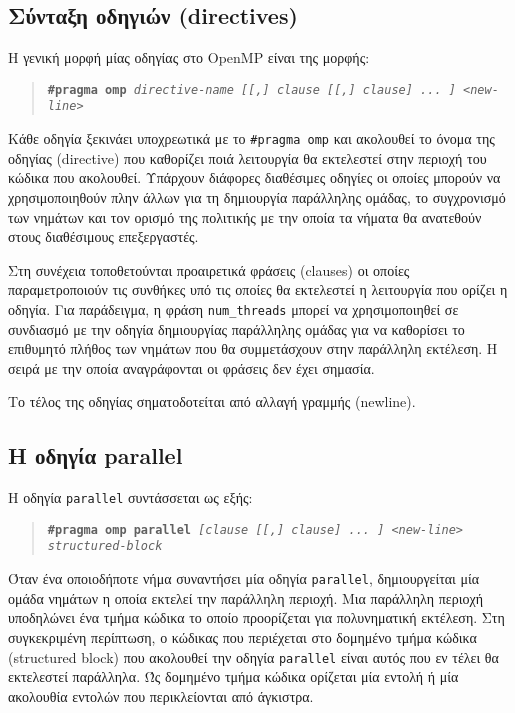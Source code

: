 \subsection{Σύνταξη οδηγιών (directives)}
Η γενική μορφή μίας οδηγίας στο OpenMP είναι της μορφής:

\begin{quote}
	\texttt{\textbf{\#pragma omp} \textit{directive-name [[,] clause [[,] clause] ... ] <new-line>}}
\end{quote}

\noindent Κάθε οδηγία ξεκινάει υποχρεωτικά με το \texttt{\#pragma omp} και ακολουθεί το όνομα της οδηγίας (directive) που καθορίζει ποιά λειτουργία θα εκτελεστεί στην περιοχή του κώδικα που ακολουθεί. Υπάρχουν διάφορες διαθέσιμες οδηγίες οι οποίες μπορούν να χρησιμοποιηθούν πλην άλλων για τη δημιουργία παράλληλης ομάδας, το συγχρονισμό των νημάτων και τον ορισμό της πολιτικής με την οποία τα νήματα θα ανατεθούν στους διαθέσιμους επεξεργαστές.

Στη συνέχεια τοποθετούνται προαιρετικά φράσεις (clauses) οι οποίες παραμετροποιούν τις συνθήκες υπό τις οποίες θα εκτελεστεί η λειτουργία που ορίζει η οδηγία. Για παράδειγμα, η φράση \texttt{num\_threads} μπορεί να χρησιμοποιηθεί σε συνδιασμό με την οδηγία δημιουργίας παράλληλης ομάδας για να καθορίσει το επιθυμητό πλήθος των νημάτων που θα συμμετάσχουν στην παράλληλη εκτέλεση. Η σειρά με την οποία αναγράφονται οι φράσεις δεν έχει σημασία.

Το τέλος της οδηγίας σηματοδοτείται από αλλαγή γραμμής (newline).

\subsection{Η οδηγία parallel}
Η οδηγία \texttt{parallel} συντάσσεται ως εξής:

\begin{quote}
	\texttt{\textbf{\#pragma omp parallel} \textit{[clause [[,] clause] ... ] <new-line>}} \\
		\texttt{\textit{structured-block}}
\end{quote}

Όταν ένα οποιοδήποτε νήμα συναντήσει μία οδηγία \texttt{parallel}, δημιουργείται μία ομάδα νημάτων η οποία εκτελεί την παράλληλη περιοχή. Μια παράλληλη περιοχή υποδηλώνει ένα τμήμα κώδικα το οποίο προορίζεται για πολυνηματική εκτέλεση. Στη συγκεκριμένη περίπτωση, ο κώδικας που περιέχεται στο δομημένο τμήμα κώδικα (structured block) που ακολουθεί την οδηγία \texttt{parallel} είναι αυτός που εν τέλει θα εκτελεστεί παράλληλα. Ώς δομημένο τμήμα κώδικα ορίζεται μία εντολή ή μία ακολουθία εντολών που περικλείονται από άγκιστρα.

